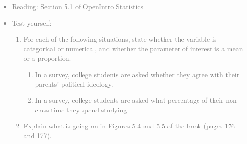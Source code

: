 \documentclass[11pt]{article}
\newcommand{\gray}[1]{\textcolor{gray}{#1}}
\begin{document}
\gray{
{\it
\vspace{-0.5cm}
\begin{itemize}
\renewcommand{\labelitemi}{{\textcolor{dark}{$\ast$}}}
\item Reading: Section 5.1 of OpenIntro Statistics
\item Test yourself: 
{\small
\begin{enumerate}
\item For each of the following situations, state whether the variable is categorical or numerical, and whether the parameter of interest is a mean or a proportion.
\begin{enumerate}
\item In a survey, college students are asked whether they agree with their parents' political ideology.  
\item In a survey, college students are asked what percentage of their non-class time they spend studying.
\end{enumerate}
\item Explain what is going on in Figures 5.4 and 5.5 of the book (pages 176 and 177).
\end{enumerate}
}
\end{itemize}
}}


%

\vspace{0.5cm}

%
\end{document}
